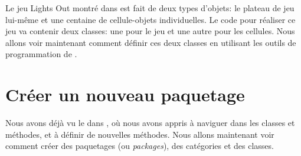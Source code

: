 \documentclass[a4paper,10pt,twoside]{book}
\begin{document}
Le jeu Lights Out montré dans  est fait de deux types d'objets: le plateau de jeu lui-m\^eme et une centaine de cellule-objets individuelles. Le code \pharo pour réaliser ce jeu va contenir deux classes: une pour le jeu et une autre pour les cellules.
Nous allons voir maintenant comment définir ces deux classes en utilisant les outils de programmation de \pharo.

\section{Créer un nouveau paquetage}

Nous avons déjà vu le 
dans , o\`u nous avons appris à naviguer dans les classes
et méthodes, et à définir de nouvelles méthodes.
Nous allons maintenant voir comment créer des paquetages (ou \emph{packages}), des catégories et des classes.

\end{document}
